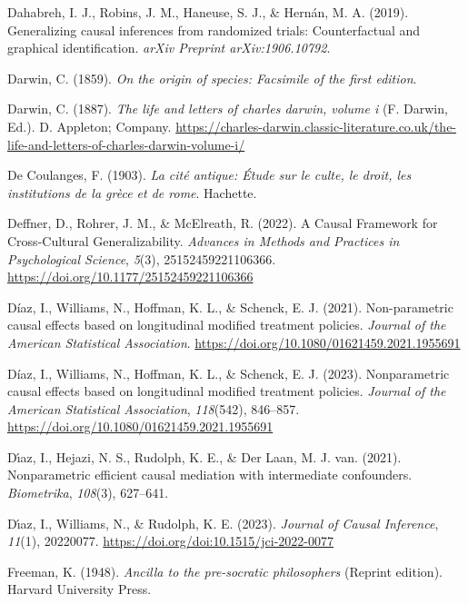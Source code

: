 \documentclass[
  single column]{article}
\newlength{\cslhangindent}
\newenvironment{CSLReferences}[2] %
 {\begin{list}{}{%
  \setlength{\itemindent}{0pt}
  \setlength{\leftmargin}{0pt}
  \setlength{\parsep}{0pt}
  \ifodd #1
   \setlength{\leftmargin}{\cslhangindent}
   \setlength{\itemindent}{-1\cslhangindent}
  \fi
  \setlength{\itemsep}{#2\baselineskip}}}
 {\end{list}}
\begin{document}
\begin{CSLReferences}{1}{0}
Dahabreh, I. J., Robins, J. M., Haneuse, S. J., \& Hernán, M. A. (2019).
Generalizing causal inferences from randomized trials: Counterfactual
and graphical identification. \emph{arXiv Preprint arXiv:1906.10792}.

Darwin, C. (1859). \emph{On the origin of species: Facsimile of the
first edition}.

Darwin, C. (1887). \emph{The life and letters of charles darwin, volume
i} (F. Darwin, Ed.). D. Appleton; Company.
\url{https://charles-darwin.classic-literature.co.uk/the-life-and-letters-of-charles-darwin-volume-i/}

De Coulanges, F. (1903). \emph{La cité antique: Étude sur le culte, le
droit, les institutions de la grèce et de rome}. Hachette.

Deffner, D., Rohrer, J. M., \& McElreath, R. (2022). A Causal Framework
for Cross-Cultural Generalizability. \emph{Advances in Methods and
Practices in Psychological Science}, \emph{5}(3), 25152459221106366.
\url{https://doi.org/10.1177/25152459221106366}

Díaz, I., Williams, N., Hoffman, K. L., \& Schenck, E. J. (2021).
Non-parametric causal effects based on longitudinal modified treatment
policies. \emph{Journal of the American Statistical Association}.
\url{https://doi.org/10.1080/01621459.2021.1955691}

Díaz, I., Williams, N., Hoffman, K. L., \& Schenck, E. J. (2023).
Nonparametric causal effects based on longitudinal modified treatment
policies. \emph{Journal of the American Statistical Association},
\emph{118}(542), 846--857.
\url{https://doi.org/10.1080/01621459.2021.1955691}

Dı́az, I., Hejazi, N. S., Rudolph, K. E., \& Der Laan, M. J. van. (2021).
Nonparametric efficient causal mediation with intermediate confounders.
\emph{Biometrika}, \emph{108}(3), 627--641.

Dı́az, I., Williams, N., \& Rudolph, K. E. (2023). \emph{Journal of
Causal Inference}, \emph{11}(1), 20220077.
\url{https://doi.org/doi:10.1515/jci-2022-0077}

Freeman, K. (1948). \emph{Ancilla to the pre-socratic philosophers}
(Reprint edition). Harvard University Press.


\end{CSLReferences}
\end{document}
